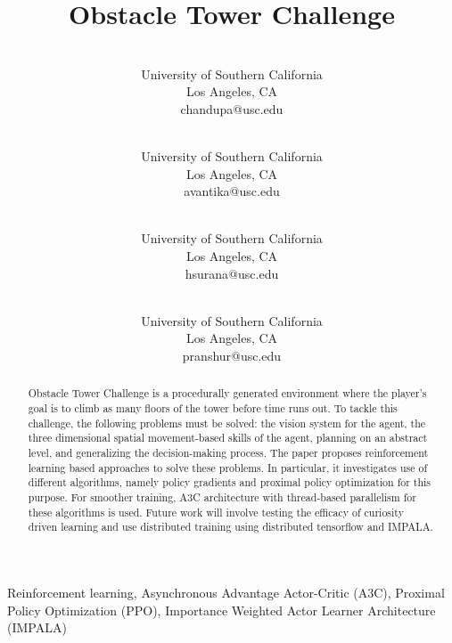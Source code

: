 \documentclass[conference]{IEEEtran}
\begin{document}
\title{Obstacle Tower Challenge}

\author{%
  \\University of Southern California\\ Los Angeles, CA \\chandupa@usc.edu\\
  \and {}\\University of Southern California\\Los Angeles, CA \\avantika@usc.edu\\
  \and {}\\University of Southern California\\Los Angeles, CA \\hsurana@usc.edu\\
  \and {}\\University of Southern California\\Los Angeles, CA \\pranshur@usc.edu\\
}

\maketitle

\begin{abstract}
Obstacle Tower Challenge is a procedurally generated environment where the player's goal is to climb as many floors of the tower before time runs out. To tackle this challenge, the following problems must be solved: the vision system for the agent, the three dimensional spatial movement-based skills of the agent, planning on an abstract level, and generalizing the decision-making process. The paper proposes reinforcement learning based approaches to solve these problems. In particular, it investigates use of different algorithms, namely policy gradients and proximal policy optimization for this purpose. For smoother training, A3C architecture with thread-based parallelism for these algorithms is used. Future work will involve testing the efficacy of curiosity driven learning and use distributed training using distributed tensorflow and IMPALA.
\end{abstract}

\begin{IEEEkeywords}
Reinforcement learning, Asynchronous Advantage Actor-Critic (A3C), Proximal Policy Optimization (PPO), Importance Weighted Actor Learner Architecture (IMPALA)
\end{IEEEkeywords}
\end{document}
